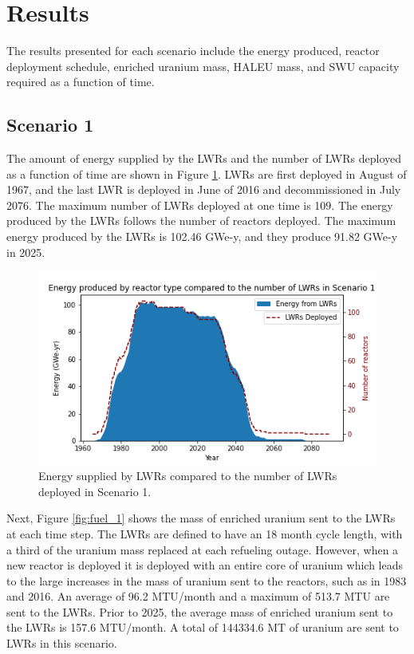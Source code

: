 \section{Results}
The results presented for each scenario include the energy produced, reactor 
deployment schedule, enriched
uranium mass, \gls{HALEU} mass, and \gls{SWU} capacity required as a function of time. 

\subsection{Scenario 1}
The amount of energy supplied by the \glspl{LWR} and the number of \glspl{LWR}
deployed as a function of time are shown in Figure \ref{fig:energy_rx_1}. 
\glspl{LWR} are first deployed in August of 1967, and the last 
\gls{LWR} is deployed in June of 2016 and decommissioned in July 2076. The 
maximum number of 
\glspl{LWR} deployed at one time is 109. The energy produced by the 
\glspl{LWR} follows the number of reactors deployed. The maximum energy 
produced by the \glspl{LWR} is 102.46 GWe-y, and they produce 91.82 GWe-y 
in 2025.

\begin{figure}
    \centering 
    \includegraphics[width=\textwidth]{../figures/energy_scenario1.png}
    \caption{Energy supplied by \glspl{LWR} compared to the number of 
    \glspl{LWR} deployed in Scenario 1.}
    \label{fig:energy_rx_1}
\end{figure}

Next, Figure \ref{fig:fuel_1} shows the mass of enriched uranium sent to 
the \glspl{LWR} at each time step. The \glspl{LWR} are 
defined to have an 18 month cycle length, with a third of the uranium 
mass replaced at each refueling outage. However, when a new reactor 
is deployed it is deployed with an entire core of uranium which leads 
to the large increases in the mass of uranium sent to the reactors, such 
as in 1983 and 2016. An average of 96.2 MTU/month and a maximum of 513.7 MTU 
are sent to the \glspl{LWR}. Prior to 2025, the average mass
of enriched uranium sent to the \glspl{LWR} is 157.6 MTU/month. A total 
of 144334.6 MT of uranium are sent to \glspl{LWR} in this scenario. 

